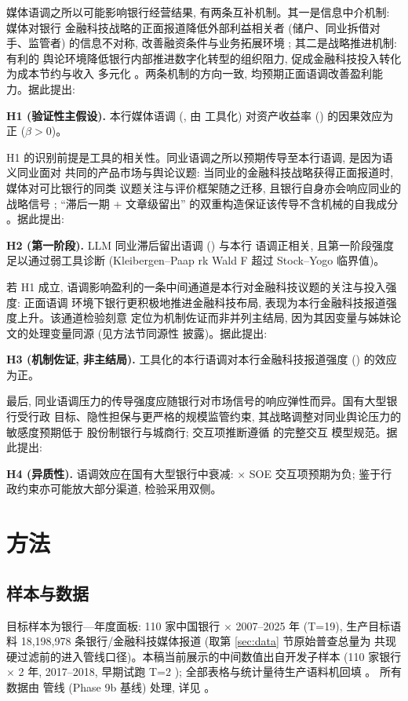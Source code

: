 媒体语调之所以可能影响银行经营结果, 有两条互补机制。其一是信息中介机制: 媒体对银行
金融科技战略的正面报道降低外部利益相关者 (储户、同业拆借对手、监管者) 的信息不对称,
改善融资条件与业务拓展环境 \parencite{tetlock2007media}; 其二是战略推进机制: 有利的
舆论环境降低银行内部推进数字化转型的组织阻力, 促成金融科技投入转化为成本节约与收入
多元化 \parencite{cheng2020bankfintech,hau2024fintechcredit}。两条机制的方向一致,
均预期正面语调改善盈利能力。据此提出:

\textbf{H1 (验证性主假设).} 本行媒体语调 (, 由
 工具化) 对资产收益率 () 的因果效应为正
($\beta > 0$)。

H1 的识别前提是工具的相关性。同业语调之所以预期传导至本行语调, 是因为语义同业面对
共同的产品市场与舆论议题: 当同业的金融科技战略获得正面报道时, 媒体对可比银行的同类
议题关注与评价框架随之迁移, 且银行自身亦会响应同业的战略信号 \parencite{leary2014peerfirms};
``滞后一期 + 文章级留出'' 的双重构造保证该传导不含机械的自我成分
\parencite{manski1993reflection}。据此提出:

\textbf{H2 (第一阶段).} LLM 同业滞后留出语调 () 与本行
语调正相关, 且第一阶段强度足以通过弱工具诊断 (Kleibergen--Paap rk Wald F 超过
Stock--Yogo 临界值)。

若 H1 成立, 语调影响盈利的一条中间通道是本行对金融科技议题的关注与投入强度: 正面语调
环境下银行更积极地推进金融科技布局, 表现为本行金融科技报道强度上升。该通道检验刻意
定位为机制佐证而非并列主结局, 因为其因变量与姊妹论文的处理变量同源 (见方法节同源性
披露)。据此提出:

\textbf{H3 (机制佐证, 非主结局).} 工具化的本行语调对本行金融科技报道强度
() 的效应为正。

最后, 同业语调压力的传导强度应随银行对市场信号的响应弹性而异。国有大型银行受行政
目标、隐性担保与更严格的规模监管约束, 其战略调整对同业舆论压力的敏感度预期低于
股份制银行与城商行; 交互项推断遵循 \textcite{brambor2006understanding} 的完整交互
模型规范。据此提出:

\textbf{H4 (异质性).} 语调效应在国有大型银行中衰减: 
$\times$ SOE 交互项预期为负; 鉴于行政约束亦可能放大部分渠道, 检验采用双侧。

\section{方法}\label{sec:method}
\subsection{样本与数据}
目标样本为银行—年度面板: 110 家中国银行 $\times$ 2007--2025 年 (T=19), 生产目标语料
18{,}198{,}978 条银行/金融科技媒体报道 (取第 \ref{sec:data} 节原始普查总量为
共现硬过滤前的进入管线口径)。本稿当前展示的中间数值出自开发子样本 (110 家银行 $\times$ 2 年,
2017--2018, 早期试跑 T=2 );
全部表格与统计量待生产语料机回填 。
所有数据由  管线 (Phase 9b 基线) 处理,
详见 。

